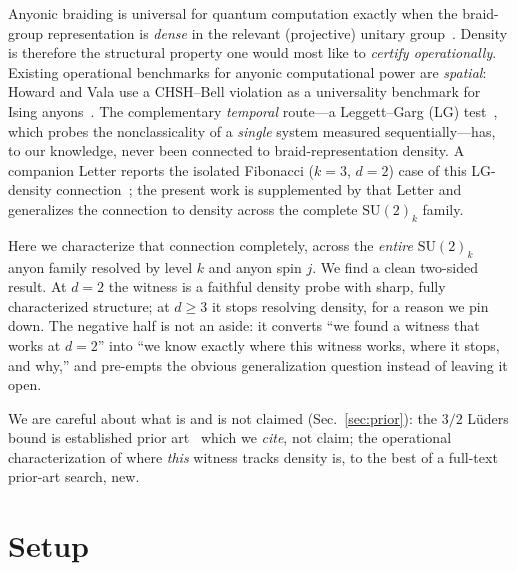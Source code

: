 \documentclass[aps,prx,reprint,amsmath,amssymb,floatfix,nofootinbib,superscriptaddress]{revtex4-2}
\begin{document}
Anyonic braiding is universal for quantum computation exactly when the braid-group
representation is \emph{dense} in the relevant (projective) unitary
group~\cite{Kup,FLW}. Density is therefore the structural property one would most like
to \emph{certify operationally}. Existing operational benchmarks for anyonic
computational power are \emph{spatial}: Howard and Vala use a CHSH--Bell violation as
a universality benchmark for Ising anyons~\cite{HV}. The complementary \emph{temporal}
route---a Leggett--Garg (LG) test~\cite{LeggettGarg1985,EmaryLambertNori2014}, which
probes the nonclassicality of a \emph{single} system measured sequentially---has, to
our knowledge, never been connected to braid-representation density. A companion
Letter reports the isolated Fibonacci ($k=3$, $d=2$) case of this LG-density
connection~\cite{Sayim2026LGI}; the present work is supplemented by that Letter
and generalizes the connection to density across the complete
$\mathrm{SU}(2)_k$ family.

Here we characterize that connection completely, across the \emph{entire}
$\mathrm{SU}(2)_k$ anyon family resolved by level $k$ and anyon spin $j$. We find a
clean two-sided result. At $d=2$ the witness is a faithful density probe with sharp,
fully characterized structure; at $d \ge 3$ it stops resolving density, for a reason
we pin down. The negative half is not an aside: it converts ``we found a witness that
works at $d=2$'' into ``we know exactly where this witness works, where it stops, and
why,'' and pre-empts the obvious generalization question instead of leaving it open.

We are careful about what is and is not claimed (Sec.~\ref{sec:prior}): the $3/2$
L\"uders bound is established prior art~\cite{BMKG,BE} which we \emph{cite}, not claim;
the operational characterization of where \emph{this} witness tracks density is, to
the best of a full-text prior-art search, new.

\section{Setup}
\label{sec:setup}
\end{document}

